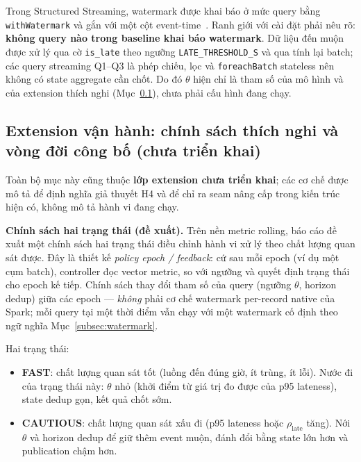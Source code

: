 Trong Structured Streaming, watermark được khai báo ở mức query bằng
\texttt{withWatermark} và gắn với một cột event-time~\cite{spark_docs_4_2,
structured_streaming_sigmod_2018}. Ranh giới với cài đặt phải nêu rõ:
\textbf{không query nào trong baseline khai báo watermark}. Dữ liệu đến
muộn được xử lý qua cờ \texttt{is\_late} theo ngưỡng
\texttt{LATE\_THRESHOLD\_S} và qua tính lại batch; các query streaming
Q1--Q3 là phép chiếu, lọc và \texttt{foreachBatch} stateless nên không có
state aggregate cần chốt. Do đó $\theta$ hiện chỉ là tham số của mô hình và
của extension thích nghi (Mục~\ref{subsec:policy}), chưa phải cấu hình đang
chạy.

\subsection{Extension vận hành: chính sách thích nghi và vòng đời công bố (chưa triển khai)}
\label{subsec:policy}
\label{subsec:lifecycle}

Toàn bộ mục này cũng thuộc \textbf{lớp extension chưa triển khai}; các cơ
chế được mô tả để định nghĩa giả thuyết H4 và để chỉ ra seam nâng cấp
trong kiến trúc hiện có, không mô tả hành vi đang chạy.

\textbf{Chính sách hai trạng thái (đề xuất).} Trên nền metric rolling, báo
cáo đề xuất một chính sách hai trạng thái điều chỉnh hành vi xử lý theo
chất lượng quan sát được. Đây là thiết kế \textit{policy epoch / feedback}:
cứ sau mỗi epoch (ví dụ một cụm batch), controller đọc vector metric, so
với ngưỡng và quyết định trạng thái cho epoch kế tiếp. Chính sách thay đổi
tham số của query (ngưỡng $\theta$, horizon dedup) giữa các epoch ---
\emph{không} phải cơ chế watermark per-record native của Spark; mỗi query tại
một thời điểm vẫn chạy với một watermark cố định theo ngữ nghĩa
Mục~\ref{subsec:watermark}.

Hai trạng thái:
\begin{itemize}
  \item \textbf{FAST}: chất lượng quan sát tốt (luồng đến đúng giờ, ít trùng,
        ít lỗi). Nước đi của trạng thái này: $\theta$ nhỏ (khởi điểm từ giá
        trị đo được của p95 lateness), state dedup gọn, kết quả chốt sớm.
  \item \textbf{CAUTIOUS}: chất lượng quan sát xấu đi (p95 lateness hoặc
        $\rho_{\mathrm{late}}$ tăng). Nới $\theta$ và horizon dedup để giữ
        thêm event muộn, đánh đổi bằng state lớn hơn và publication chậm hơn.
\end{itemize}


